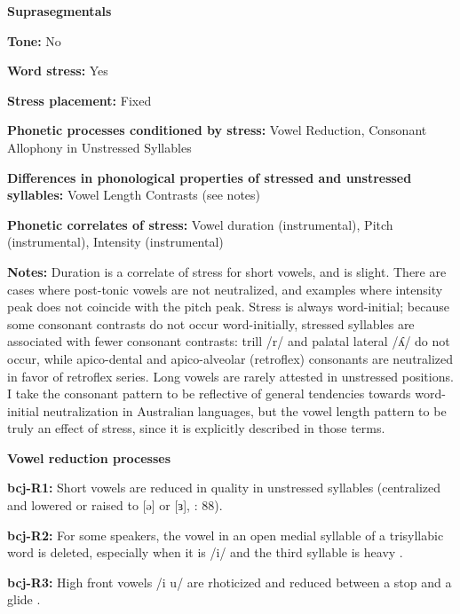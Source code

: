\textbf{Suprasegmentals}



\textbf{Tone:} No



\textbf{Word stress:} Yes



\textbf{Stress placement:} Fixed



\textbf{Phonetic processes conditioned by stress:} Vowel Reduction, Consonant Allophony in Unstressed Syllables



\textbf{Differences in phonological properties of stressed and unstressed syllables:} Vowel Length Contrasts (see notes)



\textbf{Phonetic correlates of stress:} Vowel duration (instrumental), Pitch (instrumental), Intensity (instrumental)



\textbf{Notes:} Duration is a correlate of stress for short vowels, and is slight. There are cases where post-tonic vowels are not neutralized, and examples where intensity peak does not coincide with the pitch peak. Stress is always word-initial; because some consonant contrasts do not occur word-initially, stressed syllables are associated with fewer consonant contrasts: trill /r/ and palatal lateral /ʎ/ do not occur, while apico-dental and apico-alveolar (retroflex) consonants are neutralized in favor of retroflex series. Long vowels are rarely attested in unstressed positions. I take the consonant pattern to be reflective of general tendencies towards word-initial neutralization in Australian languages, but the vowel length pattern to be truly an effect of stress, since it is explicitly described in those terms.



\textbf{Vowel reduction processes}



\textbf{bcj-R1:} Short vowels are reduced in quality in unstressed syllables (centralized and lowered or raised to [ə] or [ɜ], \citealt{Bowern2012}: 88).



\textbf{bcj-R2:} For some speakers, the vowel in an open medial syllable of a trisyllabic word is deleted, especially when it is /i/ and the third syllable is heavy \citep[91]{Bowern2012}.



\textbf{bcj-R3:} High front vowels /i u/ are rhoticized and reduced between a stop and a glide \citep[91]{Bowern2012}.



